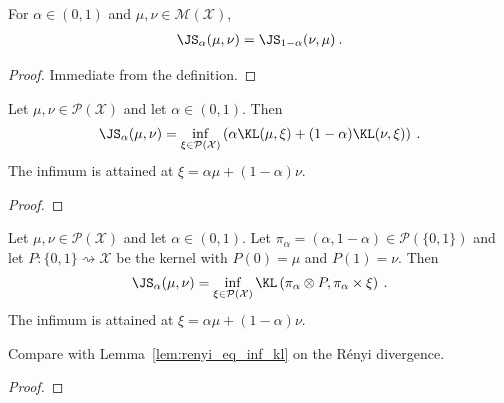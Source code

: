 \begin{lemma}
  \label{lem:jensenShannon_symm}
  For $\alpha \in (0,1)$ and $\mu, \nu \in \mathcal M(\mathcal X)$,
  \begin{align*}
  \JS_\alpha(\mu, \nu) = \JS_{1 - \alpha}(\nu, \mu) \: .
  \end{align*}
\end{lemma}

\begin{proof}%
\uses{}
Immediate from the definition.
\end{proof}


\begin{lemma}
  \label{lem:jensenShannon_eq_inf_add_kl}
  Let $\mu, \nu \in \mathcal P(\mathcal X)$ and let $\alpha \in (0, 1)$. Then
  \begin{align*}
  \JS_\alpha(\mu, \nu) = \inf_{\xi \in \mathcal P(\mathcal X)}\left( \alpha \KL(\mu, \xi) + (1 - \alpha)\KL(\nu, \xi) \right) \: .
  \end{align*}
  The infimum is attained at $\xi = \alpha \mu + (1 - \alpha) \nu$.
\end{lemma}

\begin{proof}%
\uses{}

\end{proof}


\begin{lemma}
  \label{lem:jensenShannon_eq_inf_kl}
  Let $\mu, \nu \in \mathcal P(\mathcal X)$ and let $\alpha \in (0, 1)$. Let $\pi_\alpha = (\alpha, 1 - \alpha) \in \mathcal P(\{0,1\})$ and let $P : \{0,1\} \rightsquigarrow \mathcal X$ be the kernel with $P(0) = \mu$ and $P(1) = \nu$. Then
  \begin{align*}
  \JS_\alpha(\mu, \nu) = \inf_{\xi \in \mathcal P(\mathcal X)} \KL\left( \pi_\alpha \otimes P, \pi_\alpha \times \xi \right) \: .
  \end{align*}
  The infimum is attained at $\xi = \alpha \mu + (1 - \alpha) \nu$.
\end{lemma}

Compare with Lemma~\ref{lem:renyi_eq_inf_kl} on the Rényi divergence.

\begin{proof}%
{}

\end{proof}


